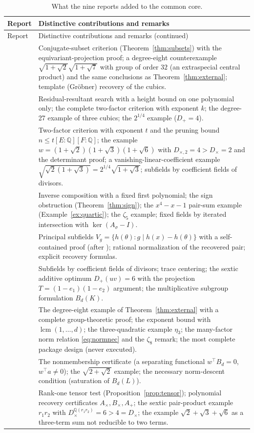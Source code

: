 \documentclass[11pt,a4paper]{article}
\theoremstyle{definition}
\theoremstyle{remark}
\newcommand{\Q}{\mathbb{Q}}
\newcommand{\lcm}{\operatorname{lcm}}
\newcommand{\Dp}{D_{+}}
\newcommand{\Dt}{D_{\times}}
\newcommand{\Dtt}{D_{\times,2}}
\begin{document}
\begingroup\small
\begin{longtable}{@{}p{30pt}p{\dimexpr\textwidth-42pt\relax}@{}}
\caption{What the nine reports added to the common core.}\label{tab:reports}\\
\toprule
Report & Distinctive contributions and remarks\\
\midrule
\endfirsthead
\toprule
Report & Distinctive contributions and remarks (continued)\\
\midrule
\endhead
\cite{r1} & Conjugate-subset criterion (Theorem~\ref{thm:subsets}) with the equivariant-projection
proof; a degree-eight counterexample $\sqrt{1+\sqrt2}\sqrt{1+\sqrt7}$ with group of order $32$ (an
extraspecial central product) and the same conclusions as Theorem~\ref{thm:external}; template
(Gr\"obner) recovery of the cubics.\\
\cite{r2} & Residual-resultant search with a height bound on one polynomial only; the complete
two-factor criterion with exponent $k$; the degree-27 example of three cubics; the $2^{1/4}$ example
($\Dp=4$).\\
\cite{r3} & Two-factor criterion with exponent $t$ and the pruning bound $n\le t[E:\Q][F:\Q]$; the
example $w=(1+\sqrt2)(1+\sqrt3)(1+\sqrt6)$ with $\Dtt=4>\Dt=2$ and the determinant proof; a
vanishing-linear-coefficient example $\sqrt{\sqrt2(1+\sqrt3)}=2^{1/4}\sqrt{1+\sqrt3}$; subfields by
coefficient fields of divisors.\\
\cite{r4} & Inverse composition with a fixed first polynomial; the sign obstruction
(Theorem~\ref{thm:sign}); the $x^4-x-1$ pair-sum example (Example~\ref{ex:quartic}); the $\zeta_5$
example; fixed fields by iterated intersection with $\ker(A_\sigma-I)$.\\
\cite{r5} & Principal subfields $V_g=\{h(\theta):g\mid h(x)-h(\theta)\}$ with a self-contained proof
(after \cite{SvH}); rational normalization of the recovered pair; explicit recovery formulas.\\
\cite{r6} & Subfields by coefficient fields of divisors; trace centering; the sextic additive
optimum $\Dp(uv)=6$ with the projection $T=(1-e_1)(1-e_2)$ argument; the multiplicative subgroup
formulation $B_d(K)$.\\
\cite{r7} & The degree-eight example of Theorem~\ref{thm:external} with a complete group-theoretic
proof; the exponent bound with $\lcm(1,\dots,d)$; the three-quadratic example $\eta_3$; the
many-factor norm relation \eqref{eq:normnec} and the $\zeta_8$ remark; the most complete package
design (never executed).\\
\cite{r8} & The nonmembership certificate (a separating functional $w^\top B_d=0$, $w^\top a\ne0$);
the $\sqrt{2+\sqrt2}$ example; the necessary norm-descent condition (saturation of $B_d(L)$).\\
\cite{r9} & Rank-one tensor test (Proposition~\ref{prop:tensor}); polynomial recovery certificates
$A_\times,B_\times,A_+$; the sextic pair-product example $r_1r_2$ with $\Dt^{\Q(r_1r_2)}=6>4=\Dt$; the
example $\sqrt2+\sqrt3+\sqrt6$ as a three-term sum not reducible to two terms.\\
\bottomrule
\end{longtable}
\endgroup
\end{document}
